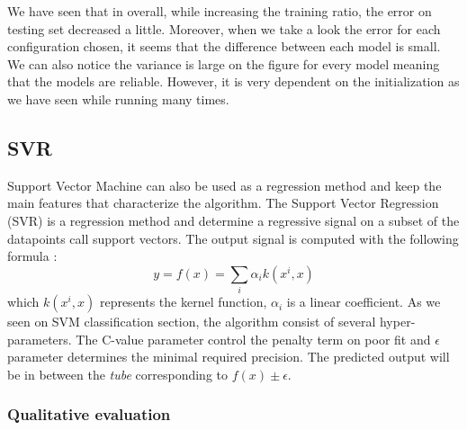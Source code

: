 We have seen that in overall, while increasing the training ratio, the error on testing set decreased a little. Moreover, when we take a look the error for each configuration chosen, it seems that the difference between each model is small. We can also notice the variance is large on the figure for every model meaning that the models are reliable. However, it is very dependent on the initialization as we have seen while running many times.


\subsection{SVR}
Support Vector Machine can also be used as a regression method and keep the main features that characterize the algorithm. The Support Vector Regression (SVR) is a regression method and determine a regressive signal on a subset of the datapoints call support vectors. The output signal is computed with the following formula :
\begin{equation}
y = f(x) = \sum_i \alpha_i k (x^{i},x)
\end{equation}
which $k(x^{i},x)$ represents the kernel function, $\alpha_i$ is a linear coefficient. As we seen on SVM classification section, the algorithm consist of several hyper-parameters. The C-value parameter control the penalty term on poor fit and $\epsilon$ parameter determines the minimal required precision. The predicted output will be in between the \emph{tube} corresponding to $f(x)\pm\epsilon$. 

\subsubsection{Qualitative evaluation}

